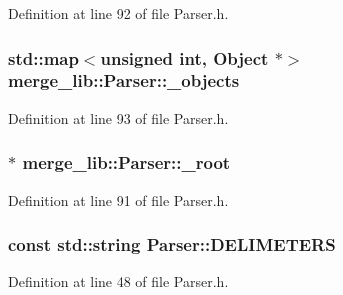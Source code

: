 Definition at line 92 of file Parser.\-h.

\hypertarget{classmerge__lib_1_1_parser_ac153e7f69cfb00ecd76d987f36dcb305}{
\subsubsection[{\-\_\-objects}]{\setlength{\rightskip}{0pt plus 5cm}std\-::map$<$unsigned int, {\bf Object} $\ast$$>$ merge\-\_\-lib\-::\-Parser\-::\-\_\-objects\hspace{0.3cm}{\ttfamily [protected]}}}\label{d4/de3/classmerge__lib_1_1_parser_ac153e7f69cfb00ecd76d987f36dcb305}


Definition at line 93 of file Parser.\-h.

\hypertarget{classmerge__lib_1_1_parser_a861ca5313f20519108b925eb1572e84c}{
\subsubsection[{\-\_\-root}]{$\ast$ merge\-\_\-lib\-::\-Parser\-::\-\_\-root\hspace{0.3cm}{\ttfamily [protected]}}}\label{d4/de3/classmerge__lib_1_1_parser_a861ca5313f20519108b925eb1572e84c}


Definition at line 91 of file Parser.\-h.

\hypertarget{classmerge__lib_1_1_parser_af4079dd0bf5d8d17a714b32b6d82a62b}{
\subsubsection[{D\-E\-L\-I\-M\-E\-T\-E\-R\-S}]{\setlength{\rightskip}{0pt plus 5cm}const std\-::string Parser\-::\-D\-E\-L\-I\-M\-E\-T\-E\-R\-S\hspace{0.3cm}{\ttfamily [static]}}}\label{d4/de3/classmerge__lib_1_1_parser_af4079dd0bf5d8d17a714b32b6d82a62b}


Definition at line 48 of file Parser.\-h.

